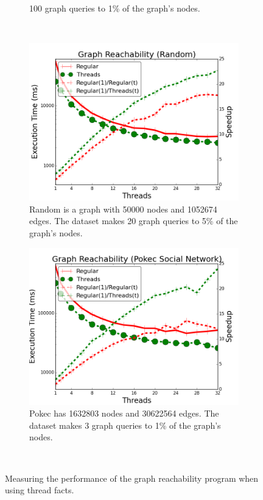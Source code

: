 \begin{figure}[]
\begin{subfigure}[b]{\plotsize\textwidth}
{           100 graph queries to 1\% of the graph's nodes.}
           \label{fig:threads:search_twitter}
        \end{subfigure} \\
        \begin{subfigure}[b]{\plotsize\textwidth}
           \includegraphics[width=\textwidth]{experiments/threads/cmp-search-random.png}
           \caption{Random is a graph with 50000 nodes and 1052674
              edges. The dataset makes 20 graph queries
              to 5\% of the graph's nodes.}
           \label{fig:threads:search_random}
        \end{subfigure}
        \spacing
        \begin{subfigure}[b]{\plotsize\textwidth}
           \includegraphics[width=\textwidth]{experiments/threads/cmp-search-pokec.png}
           \caption{Pokec has 1632803 nodes and 30622564 edges. The dataset
           makes 3 graph queries to 1\% of the graph's nodes.}
           \label{fig:threads:search_pokec}
        \end{subfigure} \\
        \caption{Measuring the performance of the graph reachability program
        when using thread facts.}
        \label{fig:threads:results_search}
\end{figure}

